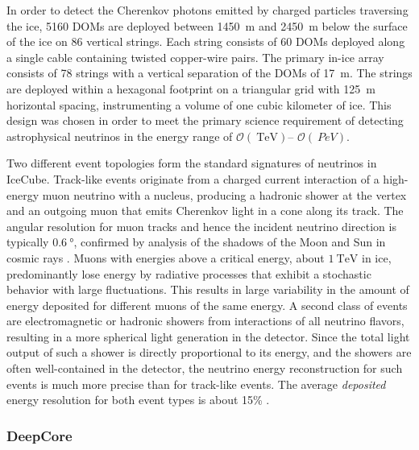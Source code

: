 In order to detect the Cherenkov photons emitted by charged particles
traversing the ice, \num{5160} DOMs are deployed between \SI{1450}{\meter}
and \SI{2450} {\meter} below the surface of the ice on \num{86} vertical
strings. Each string consists of \num{60} DOMs deployed along a
single cable containing twisted copper-wire pairs. The 
primary in-ice array consists of \num{78} strings with a vertical
separation of the DOMs of \SI{17}{\meter}.  The strings are
deployed within a hexagonal footprint on a triangular grid with
\SI{125}{\meter} horizontal spacing, 
instrumenting a volume of one cubic kilometer of ice.  This design was chosen in
order to meet the primary science requirement of detecting astrophysical
neutrinos in the energy range of $\mathcal{O}(\SI{}{\tera\electronvolt})$--
$\mathcal{O}(\SI{}{PeV})$.  %

Two different event topologies form the standard signatures of neutrinos in
IceCube.  Track-like events originate from a charged current interaction of
a high-energy muon neutrino with a nucleus, producing a hadronic shower at
the vertex and an outgoing muon that emits Cherenkov light in a cone along its
track.  The angular resolution for muon tracks and hence the incident
neutrino direction is typically $\SI{0.6}{\degree}$, confirmed by analysis
of the shadows of the Moon and Sun
in cosmic rays \cite{IC3:moon,IC3:sun}.  Muons with energies above a
critical energy, about $\SI{1}{\tera\electronvolt}$ in ice,
predominantly lose energy by radiative processes that exhibit a stochastic behavior with large fluctuations.  This results in
large variability in the amount of energy deposited 
for different muons of the same energy.  A second class of events are
electromagnetic or hadronic showers from interactions of all neutrino
flavors, resulting in a more spherical light generation in the detector.
Since the total light output of such a shower is directly proportional to its energy, and
the showers are often well-contained in the detector, the neutrino energy
reconstruction for such events is much more precise than for track-like
events. The average \emph{deposited} energy resolution for both event types
is about 15\% \cite{IC3:ereco}.

\subsubsection{DeepCore}

